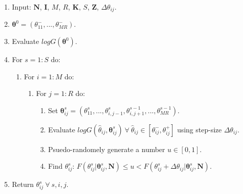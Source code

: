 \documentclass[a4paper,11pt,titlepage]{article}
\begin{document}
\begin{enumerate}
    \item Input: $\mathbf{N}$, $\mathbf{I}$, $M$, $R$, $\mathbf{K}$, $S$, $\mathbf{Z}$, $\Delta \theta_{ij}$.
    \item $\bm{\theta}^0 = (\theta_{11}^{-}, ... , \theta_{MR}^{-})$. 
    \item Evaluate $logG(\bm{\theta}^0)$.
    \item For $s = 1:S$ do:
    \begin{enumerate}
        \item For $i=1:M$ do:
        \begin{enumerate}
            \item For $j=1:R$ do:
            \begin{enumerate}
            \item Set $\bm{\theta}_{ij}^{s} = (\theta_{11}^{s},...,\theta_{i,j-1}^{s},\theta_{i,j+1}^{s-1}, ..., \theta_{MR}^{s-1})$. 
            \item Evaluate $log G(\hat{\theta}_{ij}, \bm{\theta}_{ij}^{s}) \: \forall \: \hat{\theta}_{ij} \in [\theta_{ij}^{-}, \theta_{ij}^{+}]$ using step-size $\Delta \theta_{ij}$. 
            \item Psuedo-randomely generate a number $u \in [0,1]$. 
            \item Find $\theta_{ij}^{s}$: $F(\theta_{ij}^{s} | \bm{\theta}_{ij}^{s}, \mathbf{N}) \leq u < F(\theta_{ij}^{s} + \Delta \theta_{ij}|\bm{\theta}_{ij}^{s}, \mathbf{N})$.
            \end{enumerate}
        \end{enumerate}
    \end{enumerate}
    \item Return $\theta_{ij}^{s} \: \forall \: s, i, j$. 
\end{enumerate}
\end{document}
